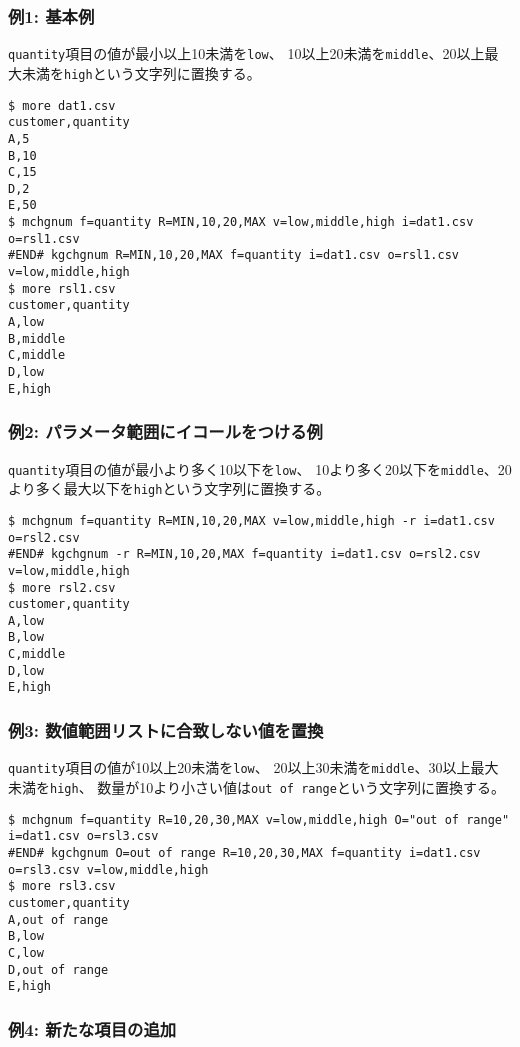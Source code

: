 \subsubsection*{例1: 基本例}

\verb|quantity|項目の値が最小以上10未満を\verb|low|、
10以上20未満を\verb|middle|、20以上最大未満を\verb|high|という文字列に置換する。


\begin{Verbatim}[baselinestretch=0.7,frame=single]
$ more dat1.csv
customer,quantity
A,5
B,10
C,15
D,2
E,50
$ mchgnum f=quantity R=MIN,10,20,MAX v=low,middle,high i=dat1.csv o=rsl1.csv
#END# kgchgnum R=MIN,10,20,MAX f=quantity i=dat1.csv o=rsl1.csv v=low,middle,high
$ more rsl1.csv
customer,quantity
A,low
B,middle
C,middle
D,low
E,high
\end{Verbatim}
\subsubsection*{例2: パラメータ範囲にイコールをつける例}

\verb|quantity|項目の値が最小より多く10以下を\verb|low|、
10より多く20以下を\verb|middle|、20より多く最大以下を\verb|high|という文字列に置換する。


\begin{Verbatim}[baselinestretch=0.7,frame=single]
$ mchgnum f=quantity R=MIN,10,20,MAX v=low,middle,high -r i=dat1.csv o=rsl2.csv
#END# kgchgnum -r R=MIN,10,20,MAX f=quantity i=dat1.csv o=rsl2.csv v=low,middle,high
$ more rsl2.csv
customer,quantity
A,low
B,low
C,middle
D,low
E,high
\end{Verbatim}
\subsubsection*{例3: 数値範囲リストに合致しない値を置換}

\verb|quantity|項目の値が10以上20未満を\verb|low|、
20以上30未満を\verb|middle|、30以上最大未満を\verb|high|、
数量が10より小さい値は\verb|out of range|という文字列に置換する。


\begin{Verbatim}[baselinestretch=0.7,frame=single]
$ mchgnum f=quantity R=10,20,30,MAX v=low,middle,high O="out of range" i=dat1.csv o=rsl3.csv
#END# kgchgnum O=out of range R=10,20,30,MAX f=quantity i=dat1.csv o=rsl3.csv v=low,middle,high
$ more rsl3.csv
customer,quantity
A,out of range
B,low
C,low
D,out of range
E,high
\end{Verbatim}
\subsubsection*{例4: 新たな項目の追加}


